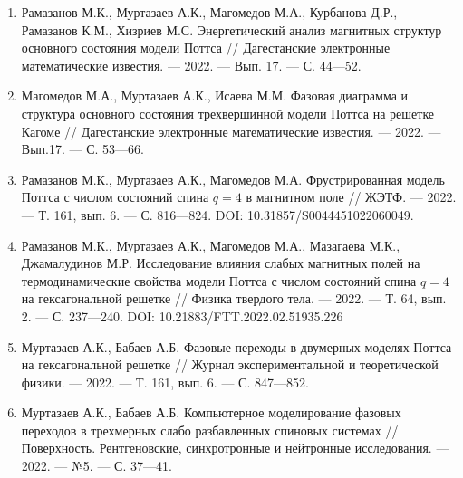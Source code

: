 \begin{enumerate}[1]
    \item
    Рамазанов М.К., Муртазаев А.К., Магомедов М.А., Курбанова Д.Р., Рамазанов К.М., Хизриев М.С.
    Энергетический анализ магнитных структур основного состояния модели Поттса
    //
    Дагестанские электронные математические известия.
    --- 2022.
    --- Вып. 17.
    --- С. 44---52.

    \item
    Магомедов М.А., Муртазаев А.К., Исаева М.М.
    Фазовая диаграмма и структура основного состояния трехвершинной модели Поттса на решетке Кагоме
    //
    Дагестанские электронные математические известия.
    --- 2022.
    --- Вып.17.
    --- С. 53---66.

    \item
    Рамазанов М.К., Муртазаев А.К., Магомедов М.А.
    Фрустрированная модель Поттса с числом состояний спина $q = 4$ в магнитном поле
    //
    ЖЭТФ.
    --- 2022.
    --- Т. 161, вып. 6.
    --- С. 816---824. DOI: 10.31857/S0044451022060049.

    \item
    Рамазанов М.К., Муртазаев А.К., Магомедов М.А., Мазагаева М.К., Джамалудинов М.Р.
    Исследование влияния слабых магнитных полей на термодинамические свойства модели Поттса с числом состояний спина $q = 4$ на гексагональной решетке
    //
    Физика твердого тела.
    --- 2022.
    --- Т. 64, вып. 2.
    --- С. 237---240. DOI: 10.21883/FTT.2022.02.51935.226



    \item
    Муртазаев А.К., Бабаев А.Б.
    Фазовые переходы в двумерных моделях Поттса на гексагональной решетке
    //
    Журнал экспериментальной и теоретической физики.
    --- 2022.
    --- Т. 161, вып. 6.
    --- С. 847---852.

    \item
    Муртазаев А.К., Бабаев А.Б.
    Компьютерное моделирование фазовых переходов в трехмерных слабо разбавленных спиновых системах
    //
    Поверхность. Рентгеновские, синхротронные и нейтронные исследования.
    --- 2022.
    --- №5.
    --- С. 37---41.

\end{enumerate}


    

